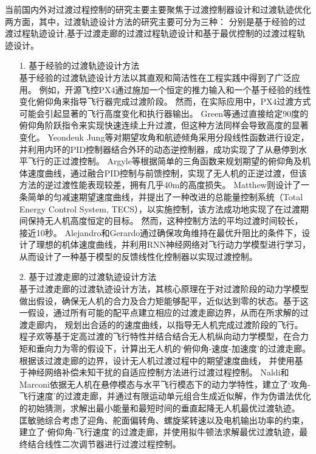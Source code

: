 当前国内外对过渡过程控制的研究主要主要聚焦于过渡控制器设计和过渡轨迹优化两方面，其中，过渡轨迹设计方法的研究主要可分为三种：
分别是基于经验的过渡过程轨迹设计,基于过渡走廊的过渡过程轨迹设计和基于最优控制的过渡过程轨迹设计\cite{1018875946.nh}。
\begin{itemize}

    \item [1.] 基于经验的过渡轨迹设计方法\\
    \hspace*{2em}基于经验的过渡轨迹设计方法以其直观和简洁性在工程实践中得到了广泛应用。
    例如，开源飞控PX4通过施加一个恒定的推力输入和一个基于经验的线性变化俯仰角来指导飞行器完成过渡阶段\cite{meier2015px4}。
    然而，在实际应用中，PX4过渡方式可能会引起显著的飞行高度变化和执行器输出。
    Green等通过直接给定90度的俯仰角阶跃指令来实现快速连续上升过渡，但这种方法同样会导致高度的显著变化\cite{green2005mav}。
    Yeondeuk Jung等对期望攻角和航迹倾角采用分段线性函数进行设定，并利用内环的PID控制器结合外环的动态逆控制器，成功实现了了从悬停到水平飞行的正过渡控制\cite{jeong2010transition}。
    Argyle等根据简单的三角函数来规划期望的俯仰角及机体速度曲线，通过融合PID控制与前馈控制，实现了无人机的正逆过渡，但该方法的逆过渡性能表现较差，拥有几乎40m的高度损失\cite{argyle2013vertical}。
    Matthew则设计了一条简单的匀减速期望速度曲线，并提出了一种改进的总能量控制系统（Total Energy Control System, TECS），以实施控制，该方法成功地实现了在过渡期间保持无人机高度恒定的目标。
    然而，这种控制方法的平均过渡时间较长，接近10秒\cite{argyle2016modeling}。
    Alejandro和Gerardo通过确保攻角维持在最优升阻比的条件下，设计了理想的机体速度曲线，并利用RNN神经网络对飞行动力学模型进行学习，从而设计了一种基于模型的反馈线性化控制器以实现过渡控制\cite{flores2020transition}。
    
    \item [2.] 基于过渡走廊的过渡轨迹设计方法\\
    \hspace*{2em}基于过渡走廊的过渡轨迹设计方法，其核心原理在于对过渡阶段的动力学模型做出假设，确保无人机的合力及合力矩能够配平，近似达到零的状态。基于这一假设，通过所有可能的配平点建立相应的过渡走廊边界，从而在所求解的过渡走廊内，
    规划出合适的的速度曲线，以指导无人机完成过渡阶段的飞行。
    程子欢等基于定高过渡的飞行特性并结合结合无人机纵向动力学模型，在合力矩和垂向力为零的假设下，计算出无人机的‘俯仰角-速度-加速度’的过渡走廊。根据该过渡走廊的边界，设计无人机过渡过程中的期望速度曲线，
    并使用基于神经网络补偿未知干扰的自适应控制方法进行过渡过程控制\cite{cheng2022transition,cheng2020neural}。
    Naldi和Marconi依据无人机在悬停模态与水平飞行模态下的动力学特性，建立了‘攻角-飞行速度’的过渡走廊，并通过有限运动单元组合生成近似解，作为伪谱法优化的初始猜测，求解出最小能量和最短时间的垂直起降无人机最优过渡轨迹\cite{naldi2011optimal}。
    匡敏驰综合考虑了迎角、舵面偏转角、螺旋桨转速以及电机输出功率的约束，建立了‘俯仰角-飞行速度’的过渡走廊，并使用拟牛顿法求解最优过渡轨迹，最终结合线性二次调节器进行过渡过程控制\cite{1018875946.nh}。
    

\end{itemize}
